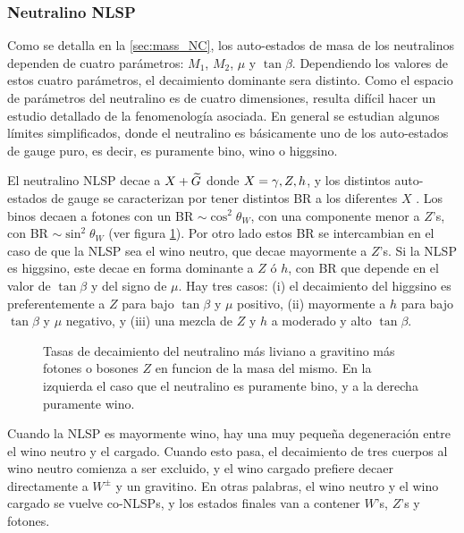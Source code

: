 \subsubsection{Neutralino NLSP}

Como se detalla en la \cref{sec:mass_NC}, los auto-estados de masa de los
neutralinos dependen de cuatro parámetros: $M_1$, $M_2$, $\mu$ y $\tan\beta$.
Dependiendo los valores de estos cuatro parámetros, el decaimiento dominante
sera distinto. Como el espacio de parámetros del neutralino es de cuatro
dimensiones, resulta difícil hacer un estudio detallado de la fenomenología asociada.
En general se estudian algunos límites simplificados, donde el neutralino
es básicamente uno de los auto-estados de gauge puro, es decir, es puramente
bino, wino o higgsino. %

El neutralino NLSP decae a $X + \widetilde{G}$ donde $X=\gamma,Z,h$, y los distintos
auto-estados de gauge se caracterizan por tener distintos BR a los diferentes $X$
\cite{Ruderman:2011vv}.
Los binos decaen a fotones con un BR $\sim \cos^2\theta_W$, con una componente
menor a $Z$'s, con BR $\sim \sin^2\theta_W$ (ver figura
\cref{fig:bino_wino_br}). Por otro lado estos BR se intercambian en el caso de
que la NLSP sea el wino neutro, que decae mayormente a $Z$'s. Si la NLSP es
higgsino, este decae en forma dominante a $Z$ ó $h$, con BR que depende en el
valor de $\tan\beta$ y del signo de $\mu$. Hay tres casos: (i) el decaimiento
del higgsino es preferentemente a $Z$ para bajo $\tan\beta$ y $\mu$ positivo,
(ii) mayormente a $h$ para bajo $\tan\beta$ y $\mu$ negativo, y (iii) una mezcla
de $Z$ y $h$ a moderado y alto $\tan\beta$.

\begin{figure}[h]
  \centering

  
  

  \caption{Tasas de decaimiento del neutralino más liviano a gravitino más fotones o bosones $Z$ en funcion de la masa del mismo. En la izquierda
    el caso que el neutralino es puramente bino, y a la derecha puramente wino.}
  \label{fig:bino_wino_br}
\end{figure}

Cuando la NLSP es mayormente wino, hay una muy pequeña degeneración entre el
wino neutro y el cargado. Cuando esto pasa, el decaimiento de tres cuerpos al
wino neutro comienza a ser excluido, y el wino cargado prefiere decaer
directamente a $W^{\pm}$ y un gravitino. En otras palabras, el wino neutro y el
wino cargado se vuelve co-NLSPs, y los estados finales van a contener $W$'s,
$Z$'s y fotones.

